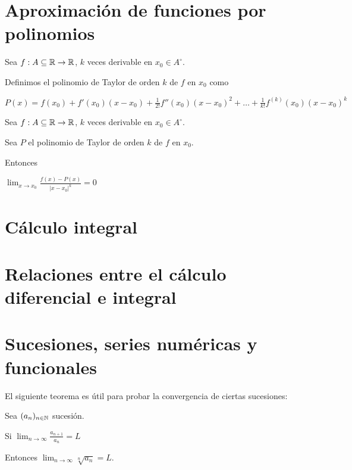 \chapter{Aproximación de funciones por polinomios}

\begin{definition}[Taylor]
Sea $f : A \subseteq \mathbb{R} \to \mathbb{R}$, $k$ veces derivable en $x_0 \in A^\circ$.  

Definimos el polinomio de Taylor de orden $k$ de $f$ en $x_0$ como

$P(x) = f(x_0) + f'(x_0)(x-x_0) + \frac{1}{2!}f''(x_0)(x-x_0)^2 + \ldots + \frac{1}{k!}f^{(k)}(x_0)(x-x_0)^k $
\end{definition}

\begin{theorem}[Taylor]
Sea $f : A \subseteq \mathbb{R} \to \mathbb{R}$, $k$ veces derivable en $x_0 \in A^\circ$.  

Sea $P$ el polinomio de Taylor de orden $k$ de $f$ en $x_0$.

Entonces

$ \lim_{x \to x_0} \frac{f(x) - P(x)}{ |x - x_0|^k } = 0 $
\end{theorem}



\chapter{Cálculo integral}

\chapter{Relaciones entre el cálculo diferencial e integral}

\chapter{Sucesiones, series numéricas y funcionales}

El siguiente teorema es útil para probar la convergencia de ciertas sucesiones:

\begin{theorem}
Sea $(a_n)_{n \in \mathbb{N}}$ sucesión.

Si $\lim_{n \to \infty} \frac{a_{n+1}}{a_n} = L$

Entonces $\lim_{n \to \infty} \sqrt[n]{a_n} = L$.
\end{theorem}



